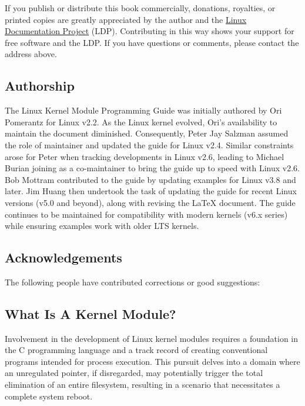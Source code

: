 \documentclass[10pt, oneside]{book}
\begin{document}
If you publish or distribute this book commercially, donations, royalties,
or printed copies are greatly appreciated by the author and the \href{https://tldp.org/}{Linux Documentation Project} (LDP).
Contributing in this way shows your support for free software and the LDP.
If you have questions or comments, please contact the address above.

\subsection{Authorship}
\label{sec:authorship}

The Linux Kernel Module Programming Guide was initially authored by Ori Pomerantz for Linux v2.2.
As the Linux kernel evolved, Ori's availability to maintain the document diminished.
Consequently, Peter Jay Salzman assumed the role of maintainer and updated the guide for Linux v2.4.
Similar constraints arose for Peter when tracking developments in Linux v2.6,
leading to Michael Burian joining as a co-maintainer to bring the guide up to speed with Linux v2.6.
Bob Mottram contributed to the guide by updating examples for Linux v3.8 and later.
Jim Huang then undertook the task of updating the guide for recent Linux versions (v5.0 and beyond),
along with revising the LaTeX document.
The guide continues to be maintained for compatibility with modern kernels (v6.x series) while ensuring examples work with older LTS kernels.

\subsection{Acknowledgements}
\label{sec:acknowledgements}

The following people have contributed corrections or good suggestions:

\begin{flushleft}

\end{flushleft}

\subsection{What Is A Kernel Module?}
\label{sec:kernelmod}

Involvement in the development of Linux kernel modules requires a foundation in the C programming language and a track record of creating conventional programs intended for process execution.
This pursuit delves into a domain where an unregulated pointer, if disregarded,
may potentially trigger the total elimination of an entire filesystem,
resulting in a scenario that necessitates a complete system reboot.
\end{document}

